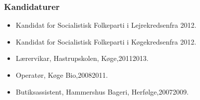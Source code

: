 \documentclass[11pt, a4paper]{awesome-cv}
\begin{document}
\begin{cvletter}
\subsubsection*{Kandidaturer}
\begin{itemize}
\item Kandidat for Socialistisk Folkeparti i Lejrekredsenfra 2012.
\item Kandidat for Socialistisk Folkeparti i Køgekredsenfra 2012.
\end{itemize}
\begin{itemize}
\item Lærervikar, Hastrupskolen, Køge,20112013.
\item Operatør, Køge Bio,20082011.
\item Butiksassistent, Hammershus Bageri, Herfølge,20072009.
\end{itemize}
\end{cvletter}
\end{document}
